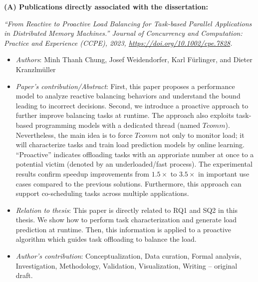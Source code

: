 \textbf{(A) Publications directly associated with the dissertation:}

\textit{``From Reactive to Proactive Load Balancing for Task-based Parallel Applications in Distributed Memory Machines.'' Journal of Concurrency and Computation: Practice and Experience (CCPE), 2023,  \url{https://doi.org/10.1002/cpe.7828}.}
\begin{itemize}
	\item \textit{Authors}: Minh Thanh Chung, Josef Weidendorfer, Karl Fürlinger, and Dieter Kranzlmüller
	\item \textit{Paper's contribution/Abstract}: First, this paper proposes a performance model to analyze reactive balancing behaviors and understand the bound leading to incorrect decisions. Second, we introduce a proactive approach to further improve balancing tasks at runtime. The approach also exploits task-based programming models with a dedicated thread (named $Tcomm$). Nevertheless, the main idea is to force $Tcomm$ not only to monitor load; it will characterize tasks and train load prediction models by online learning. ``Proactive'' indicates offloading tasks with an approriate number at once to a potential victim (denoted by an underloaded/fast process). The experimental results confirm speedup improvements from $1.5\times$ to $3.5\times$ in important use cases compared to the previous solutions. Furthermore, this approach can support co-scheduling tasks across multiple applications.
	\item \textit{Relation to thesis}: This paper is directly related to RQ1 and SQ2 in this thesis. We show how to perform task characterization and generate load prediction at runtime. Then, this information is applied to a proactive algorithm which guides task offloading to balance the load.
	\item \textit{Author's contribution}: Conceptualization, Data curation, Formal analysis, Investigation, Methodology, Validation, Visualization, Writing – original draft.
\end{itemize}

